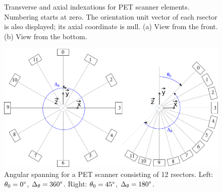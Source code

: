 \documentclass[a4paper, 11pt]{article}
\begin{document}
\begin{figure}
  \centerline
  {
  }
  \caption
  {
    Transverse and axial indexations for PET scanner elements. 
    Numbering starts at zero. The orientation unit vector of each rsector is also displayed; its axial coordinate is null.
   (a) View from the front.
   (b) View from the bottom.
  }
  \label{fig_scanner_description}
\end{figure}

\begin{figure}
  \centerline{\includegraphics[width=0.8\columnwidth]{./figures/rsectors.pdf}}
  \caption
  {
    Angular spanning for a PET scanner consisting of 12 rsectors. Left: $\theta_0=0\degree$, $\Delta_{\theta}=360\degree$.
    Right: $\theta_0=45\degree$, $\Delta_{\theta}=180\degree$.
  }
  \label{fig_rsector}
\end{figure}
\end{document}
